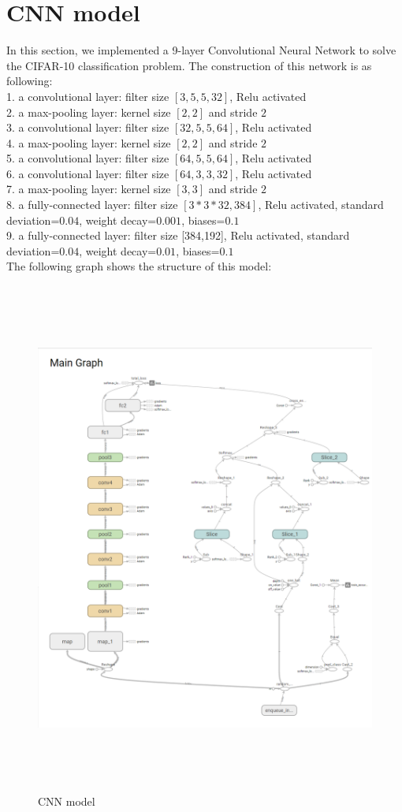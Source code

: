 \documentclass[hyperref]{article}
\theoremstyle{nonumberplain}
\begin{document}
\section{CNN model}
In this section, we implemented a 9-layer Convolutional Neural Network to solve the CIFAR-10 classification problem. The construction of this network is as following: \\
1. a convolutional layer: filter size $[3,5,5,32]$, Relu activated \\
2. a max-pooling layer: kernel size $[2,2]$ and stride $2$ \\
3. a convolutional layer: filter size $[32,5,5,64]$, Relu activated \\
4. a max-pooling layer: kernel size $[2,2]$ and stride $2$ \\
5. a convolutional layer: filter size $[64,5,5,64]$, Relu activated \\
6. a convolutional layer: filter size $[64,3,3,32]$, Relu activated \\
7. a max-pooling layer: kernel size $[3,3]$ and stride $2$ \\
8. a fully-connected layer: filter size $[3*3*32,384]$, Relu activated, standard deviation=$0.04$, weight decay=$0.001$, biases=$0.1$ \\
9. a fully-connected layer: filter size [384,192], Relu activated, standard deviation=$0.04$, weight decay=$0.01$, biases=$0.1$ \\

The following graph shows the structure of this model: \\
\begin{figure}[htbp]
\centering
\includegraphics[height=480pt]{main_graph.png}
\caption{CNN model}
\label{main}
\end{figure}
\end{document}
